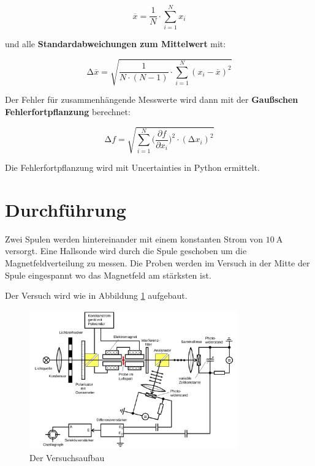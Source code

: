 \begin{equation}
    \overline{x} = \frac{1}{N} \cdot \sum_{i=1}^N x_i
    \label{eqn:Mittelwert}
\end{equation}

und alle \textbf{Standardabweichungen zum Mittelwert} mit:

\begin{equation}
    \increment\overline{x} = \sqrt{\frac{1}{N\cdot(N-1)}\cdot\sum_{i=1}^N (x_i-\overline{x})^2}
    \label{eqn:St_Mittelwert}
\end{equation}

Der Fehler für zusammenhängende Messwerte wird dann mit der \textbf{Gaußschen Fehlerfortpflanzung} berechnet:

\begin{equation}
    \increment{f} = \sqrt{ \sum_{i = 1}^{N}  \biggl(\frac{\partial{f}}{\partial{x_i}}\biggr)^2\cdot(\increment{x_i})^2}
    \label{eqn:Gauss}
\end{equation}

Die Fehlerfortpflanzung wird mit Uncertainties in Python \cite{uncertainties} ermittelt.



\section{Durchführung\cite{man}}%
Zwei Spulen werden hintereinander mit einem konstanten Strom von
$\qty{10}{\ampere}$ versorgt. Eine Hallsonde wird durch die Spule geschoben um
die Magnetfeldverteilung zu messen. Die Proben werden im Versuch in der 
Mitte der Spule eingespannt wo das Magnetfeld am stärksten ist.

Der Versuch wird wie in Abbildung \ref{fig:aufbau} aufgebaut.

\begin{figure}
    \centering
    \includegraphics[width=0.8\textwidth]{./Bilder/aufbau.png}
    \caption{Der Versuchsaufbau \cite{man}}\label{fig:aufbau}
\end{figure}

